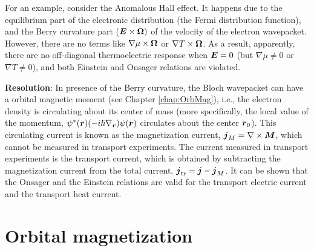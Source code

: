 \documentclass{report}
\renewcommand\vec[1]{\ensuremath\boldsymbol{#1}} %
\begin{document}
For an example, consider the Anomalous Hall effect. It happens due to the equilibrium part of the electronic distribution (the Fermi distribution function), and the Berry curvature part ($\vec{E} \times \vec{\Omega})$ of the velocity of the electron wavepacket. However, there are no terms like $\nabla \mu \times \vec{\Omega}$ or $\nabla T \times \vec{\Omega}$. As a result, apparently, there are no off-diagonal thermoelectric response when $\vec{E} = 0$ (but $\nabla \mu \neq 0$ or $\nabla T \neq 0$), and both Einstein and Onsager relations are violated.

\textbf{Resolution}: In presence of the Berry curvature, the Bloch wavepacket can have a orbital magnetic moment (see Chapter \ref{chap:OrbMag}), i.e., the electron density is circulating about its center of mass (more specifically, the local value of the momentum, $\psi^*(\vec{r}) (-i \hbar \nabla_{\vec{r}}) \psi(\vec{r})$ circulates about the center $\vec{r}_0$). This circulating current is known as the magnetization current, $\vec{j}_M = \nabla \times \vec{M}$, which cannot be measured in transport experiments. The current measured in transport experiments is the transport current, which is obtained by subtracting the magnetization current from the total current, $\vec{j}_{\text{tr}} = \vec{j} - \vec{j}_M$. It can be shown that the Onsager and the Einstein relations are valid for the transport electric current and the transport heat current.


\chapter{Orbital magnetization}~\label{chap:OrbMag}
\end{document}
